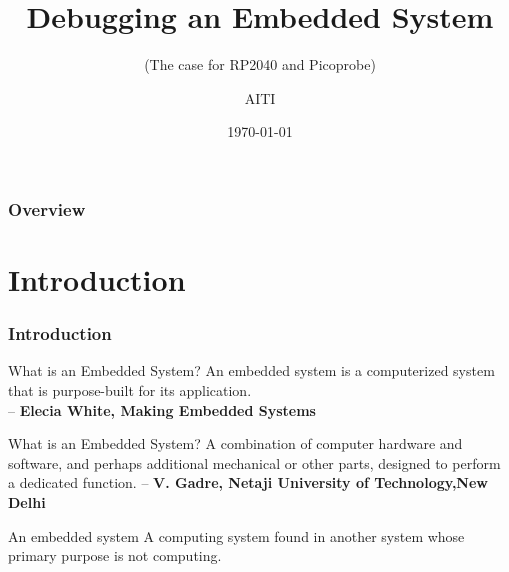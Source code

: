 \documentclass{beamer}
\title[RP2040 Debugging]{Debugging an Embedded System} %
\subtitle{(The case for RP2040 and Picoprobe)}
\author{AITI} %
\institute[AITI] %
{
	AITI \\ %
	\medskip
	\textit{renen@aiti-kace.com.gh} %
}
\date{\today} %
\begin{document}
	
	\begin{frame}
		\titlepage %
	\end{frame}
	
	\begin{frame}
		\frametitle{Overview} %
		\tableofcontents %
	\end{frame}
	
	

	

\section{Introduction}
\begin{frame}
	\frametitle{Introduction}
	\begin{block}{What is an Embedded System?}
		An embedded system is a computerized system that is purpose-built for its application. \\
		--\textbf{ Elecia White, Making Embedded Systems}
	\end{block}
	
	\begin{block}{What is an Embedded System?}
		A combination of computer hardware and software, and perhaps additional mechanical or other parts,
designed to perform a dedicated function. \newline
		-- \textbf{V. Gadre, Netaji University of Technology,New Delhi}
	\end{block}
\begin{block}{An embedded system}
	A computing system found in another system whose primary purpose is not computing.
\end{block}

\end{frame}
\end{document}
